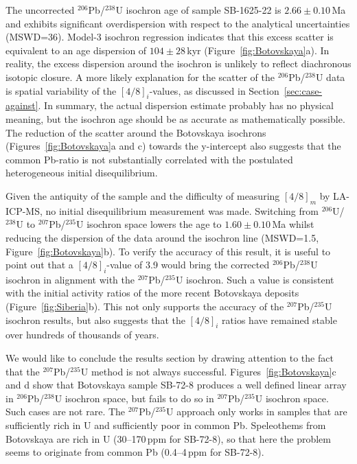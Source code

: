 \documentclass{article}
\begin{document}
The uncorrected ${}^{206}$Pb/${}^{238}$U isochron age of sample
SB-1625-22 is $2.66\pm{0.10}$\,Ma and exhibits significant
overdispersion with respect to the analytical uncertainties (MSWD=36).
Model-3 isochron regression \citep[\emph{sensu}][]{vermeesch2024}
indicates that this excess scatter is equivalent to an age dispersion
of $104\pm{28}$\,kyr (Figure~\ref{fig:Botovskaya}a). In reality, the
excess dispersion around the isochron is unlikely to reflect
diachronous isotopic closure. A more likely explanation for the
scatter of the ${}^{206}$Pb/${}^{238}$U data is spatial variability of
the $[4/8]_i$-values, as discussed in
Section~\ref{sec:case-against}. In summary, the actual dispersion
estimate probably has no physical meaning, but the isochron age should
be as accurate as mathematically possible. The reduction of the
scatter around the Botovskaya isochrons (Figures~\ref{fig:Botovskaya}a
and c) towards the y-intercept also suggests that the common Pb-ratio
is not substantially correlated with the postulated heterogeneous
initial disequilibrium.\medskip

Given the antiquity of the sample and the difficulty of measuring
$[4/8]_m$ by LA-ICP-MS, no initial disequilibrium measurement was
made. Switching from ${}^{206}$U/${}^{238}$U to
${}^{207}$Pb/${}^{235}$U isochron space lowers the age to
$1.60\pm{0.10}$\,Ma whilst reducing the dispersion of the data around
the isochron line (MSWD=1.5, Figure~\ref{fig:Botovskaya}b). To verify
the accuracy of this result, it is useful to point out that a
$[4/8]_i$-value of 3.9 would bring the corrected
${}^{206}$Pb/${}^{238}$U isochron in alignment with the
${}^{207}$Pb/${}^{235}$U isochron. Such a value is consistent with the
initial activity ratios of the more recent Botovskaya deposits
(Figure~\ref{fig:Siberia}b). This not only supports the accuracy of
the ${}^{207}$Pb/${}^{235}$U isochron results, but also suggests that
the $[4/8]_i$ ratios have remained stable over hundreds of thousands
of years.\medskip

We would like to conclude the results section by drawing attention to
the fact that the ${}^{207}$Pb/${}^{235}$U method is not always
successful. Figures~\ref{fig:Botovskaya}c and d show that Botovskaya
sample SB-72-8 produces a well defined linear array in
${}^{206}$Pb/${}^{238}$U isochron space, but fails to do so in
${}^{207}$Pb/${}^{235}$U isochron space.  Such cases are not rare. The
${}^{207}$Pb/${}^{235}$U approach only works in samples that are
sufficiently rich in U and sufficiently poor in common Pb. Speleothems
from Botovskaya are rich in U (30--170\,ppm for SB-72-8), so that here
the problem seems to originate from common Pb (0.4--4\,ppm for
SB-72-8).\medskip
\end{document}
